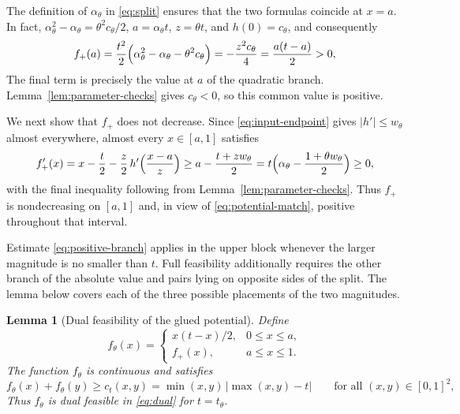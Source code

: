 \documentclass{article}
\newtheorem{lemma}[theorem]{Lemma}
\theoremstyle{definition}
\theoremstyle{remark}
\newcommand{\1}{\mathds{1}}
\newcommand{\I}{[0,1]}
\begin{document}
The definition of $\alpha_\theta$ in \eqref{eq:split} ensures that the two formulas coincide at $x=a$.
In fact, $\alpha_\theta^2-\alpha_\theta=\theta^2c_\theta/2$, $a=\alpha_\theta t$, $z=\theta t$, and $h(0)=c_\theta$, and consequently
\begin{equation}\label{eq:potential-match}
	f_+(a)=\frac{t^2}{2}\Bigl(\alpha_\theta^2-\alpha_\theta-\theta^2c_\theta\Bigr)=-\frac{z^2c_\theta}{4}=\frac{a(t-a)}{2}>0,
\end{equation}
The final term is precisely the value at $a$ of the quadratic branch. Lemma~\ref{lem:parameter-checks} gives $c_\theta<0$, so this common value is positive.

We next show that $f_+$ does not decrease.
Since \eqref{eq:input-endpoint} gives $|h'|\le w_\theta$ almost everywhere, almost every $x\in[a,1]$ satisfies
\begin{equation}\label{eq:potential-monotone}
	f_+'(x)=x-\frac t2-\frac z2\,h'\Bigl(\frac{x-a}{z}\Bigr)\ge a-\frac{t+zw_\theta}{2}=t\Bigl(\alpha_\theta-\frac{1+\theta w_\theta}{2}\Bigr)\ge0,
\end{equation}
with the final inequality following from Lemma~\ref{lem:parameter-checks}.
Thus $f_+$ is nondecreasing on $[a,1]$ and, in view of \eqref{eq:potential-match}, positive throughout that interval.

Estimate \eqref{eq:positive-branch} applies in the upper block whenever
the larger magnitude is no smaller than $t$. Full feasibility additionally
requires the other branch of the absolute value and pairs lying on opposite
sides of the split. The lemma below covers each of the three possible
placements of the two magnitudes.

\begin{lemma}[Dual feasibility of the glued potential]\label{lem:extension}
	Define
	\begin{equation}\label{eq:glued-potential}
		f_\theta(x)=\begin{cases}x(t-x)/2,&0\le x\le a,\\ f_+(x),&a\le x\le1.\end{cases}
	\end{equation}
	The function $f_\theta$ is continuous and satisfies
	\begin{equation}\label{eq:global-dual}
		f_\theta(x)+f_\theta(y)\ge c_t(x,y)=\min(x,y)\,|\max(x,y)-t|\qquad\text{for all }(x,y)\in\I^2,
	\end{equation}
	Thus $f_\theta$ is dual feasible in \eqref{eq:dual} for $t=t_\theta$.
\end{lemma}
\end{document}
